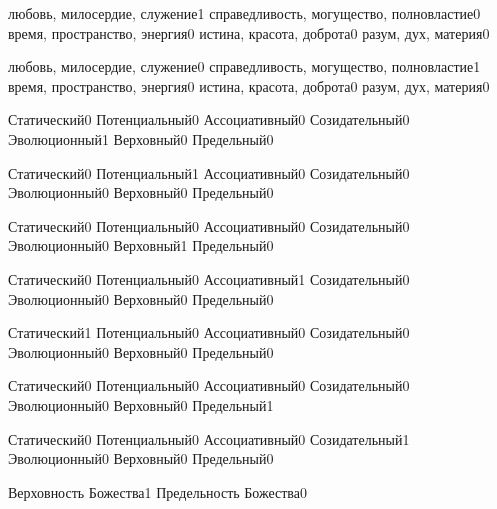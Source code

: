 {любовь, милосердие, служение}{1}
{справедливость, могущество, полновластие}{0}
{время, пространство, энергия}{0}
{истина, красота, доброта}{0}
{разум, дух, материя}{0}
\qstop

{любовь, милосердие, служение}{0}
{справедливость, могущество, полновластие}{1}
{время, пространство, энергия}{0}
{истина, красота, доброта}{0}
{разум, дух, материя}{0}
\qstop

{Статический}{0}
{Потенциальный}{0}
{Ассоциативный}{0}
{Созидательный}{0}
{Эволюционный}{1}
{Верховный}{0}
{Предельный}{0}
\qstop

{Статический}{0}
{Потенциальный}{1}
{Ассоциативный}{0}
{Созидательный}{0}
{Эволюционный}{0}
{Верховный}{0}
{Предельный}{0}
\qstop

{Статический}{0}
{Потенциальный}{0}
{Ассоциативный}{0}
{Созидательный}{0}
{Эволюционный}{0}
{Верховный}{1}
{Предельный}{0}
\qstop

{Статический}{0}
{Потенциальный}{0}
{Ассоциативный}{1}
{Созидательный}{0}
{Эволюционный}{0}
{Верховный}{0}
{Предельный}{0}
\qstop

{Статический}{1}
{Потенциальный}{0}
{Ассоциативный}{0}
{Созидательный}{0}
{Эволюционный}{0}
{Верховный}{0}
{Предельный}{0}
\qstop

{Статический}{0}
{Потенциальный}{0}
{Ассоциативный}{0}
{Созидательный}{0}
{Эволюционный}{0}
{Верховный}{0}
{Предельный}{1}
\qstop

{Статический}{0}
{Потенциальный}{0}
{Ассоциативный}{0}
{Созидательный}{1}
{Эволюционный}{0}
{Верховный}{0}
{Предельный}{0}
\qstop

{Верховность Божества}{1}
{Предельность Божества}{0}
\qstop

